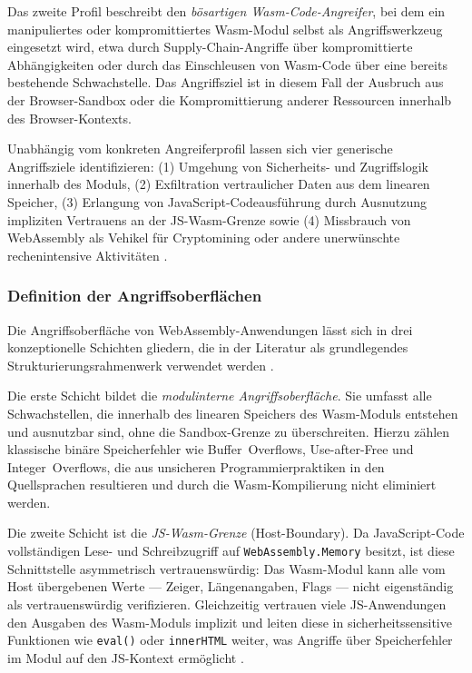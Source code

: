 Das zweite Profil beschreibt den \textit{bösartigen Wasm-Code-Angreifer}, bei dem ein manipuliertes oder kompromittiertes Wasm-Modul selbst als Angriffswerkzeug eingesetzt wird, etwa durch Supply-Chain-Angriffe über kompromittierte Abhängigkeiten oder durch das Einschleusen von Wasm-Code über eine bereits bestehende Schwachstelle. Das Angriffsziel ist in diesem Fall der Ausbruch aus der Browser-Sandbox oder die Kompromittierung anderer Ressourcen innerhalb des Browser-Kontexts.

Unabhängig vom konkreten Angreiferprofil lassen sich vier generische Angriffsziele identifizieren: (1) Umgehung von Sicherheits- und Zugriffslogik innerhalb des Moduls, (2) Exfiltration vertraulicher Daten aus dem linearen Speicher, (3) Erlangung von JavaScript-Codeausführung durch Ausnutzung impliziten Vertrauens an der JS-Wasm-Grenze sowie (4) Missbrauch von WebAssembly als Vehikel für Cryptomining oder andere unerwünschte rechenintensive Aktivitäten \cite{PERRONE2025100728}.

\subsubsection{Definition der Angriffsoberflächen}

Die Angriffsoberfläche von WebAssembly-Anwendungen lässt sich in drei konzeptionelle Schichten gliedern, die in der Literatur als grundlegendes Strukturierungsrahmenwerk verwendet werden \cite{2023-30049}.

Die erste Schicht bildet die \textit{modulinterne Angriffsoberfläche}. Sie umfasst alle Schwachstellen, die innerhalb des linearen Speichers des Wasm-Moduls entstehen und ausnutzbar sind, ohne die Sandbox-Grenze zu überschreiten. Hierzu zählen klassische binäre Speicherfehler wie Buffer~Overflows, Use-after-Free und Integer~Overflows, die aus unsicheren Programmierpraktiken in den Quellsprachen resultieren und durch die Wasm-Kompilierung nicht eliminiert werden.

Die zweite Schicht ist die \textit{JS-Wasm-Grenze} (Host-Boundary). Da JavaScript-Code vollständigen Lese- und Schreibzugriff auf \texttt{WebAssembly.Memory} besitzt, ist diese Schnittstelle asymmetrisch vertrauenswürdig: Das Wasm-Modul kann alle vom Host übergebenen Werte --- Zeiger, Längenangaben, Flags --- nicht eigenständig als vertrauenswürdig verifizieren. Gleichzeitig vertrauen viele JS-Anwendungen den Ausgaben des Wasm-Moduls implizit und leiten diese in sicherheitssensitive Funktionen wie \texttt{eval()} oder \texttt{innerHTML} weiter, was Angriffe über Speicherfehler im Modul auf den JS-Kontext ermöglicht \cite{10.1145/3728937}.

